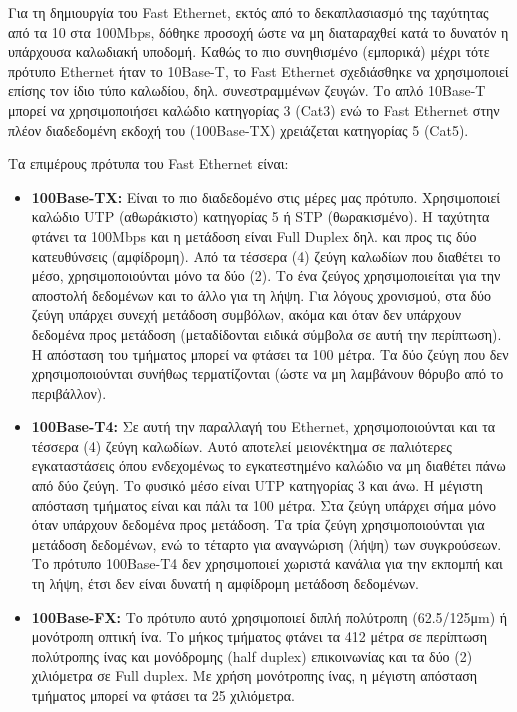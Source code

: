 Για τη δημιουργία του Fast Ethernet, εκτός από το δεκαπλασιασμό της ταχύτητας από τα 10 στα 100Mbps, δόθηκε προσοχή ώστε να μη διαταραχθεί κατά το δυνατόν η υπάρχουσα καλωδιακή υποδομή. Καθώς το πιο συνηθισμένο (εμπορικά) μέχρι τότε πρότυπο Ethernet ήταν το 10Base-T, το Fast Ethernet σχεδιάσθηκε να χρησιμοποιεί επίσης τον ίδιο τύπο καλωδίου, δηλ. συνεστραμμένων ζευγών. Το απλό 10Base-T μπορεί να χρησιμοποιήσει καλώδιο κατηγορίας 3 (Cat3) ενώ το Fast Ethernet στην πλέον διαδεδομένη εκδοχή του (100Base-TX) χρειάζεται κατηγορίας 5 (Cat5). 

Τα επιμέρους πρότυπα του Fast Ethernet είναι:

\begin{itemize}
\item \textbf{100Base-TX:} Είναι το πιο διαδεδομένο στις μέρες μας πρότυπο. Χρησιμοποιεί καλώδιο UTP (αθωράκιστο) κατηγορίας 5 ή STP (θωρακισμένο). Η ταχύτητα φτάνει τα 100Mbps και η μετάδοση είναι Full Duplex δηλ. και προς τις δύο κατευθύνσεις (αμφίδρομη). Από τα τέσσερα (4) ζεύγη καλωδίων που διαθέτει το μέσο, χρησιμοποιούνται μόνο τα δύο (2). Το ένα ζεύγος χρησιμοποιείται για την αποστολή δεδομένων και το άλλο για τη λήψη. Για λόγους χρονισμού, στα δύο ζεύγη υπάρχει συνεχή μετάδοση συμβόλων, ακόμα και όταν δεν υπάρχουν δεδομένα προς μετάδοση (μεταδίδονται ειδικά σύμβολα σε αυτή την περίπτωση). Η απόσταση του τμήματος μπορεί να φτάσει τα 100 μέτρα. Τα δύο ζεύγη που δεν χρησιμοποιούνται συνήθως τερματίζονται (ώστε να μη λαμβάνουν θόρυβο από το περιβάλλον). 
\item \textbf{100Base-T4:} Σε αυτή την παραλλαγή του Ethernet, χρησιμοποιούνται και τα τέσσερα (4) ζεύγη καλωδίων. Αυτό αποτελεί μειονέκτημα σε παλιότερες εγκαταστάσεις όπου ενδεχομένως το εγκατεστημένο καλώδιο να μη διαθέτει πάνω από δύο ζεύγη. Το φυσικό μέσο είναι UTP κατηγορίας 3 και άνω. Η μέγιστη απόσταση τμήματος είναι και πάλι τα 100 μέτρα. Στα ζεύγη υπάρχει σήμα μόνο όταν υπάρχουν δεδομένα προς μετάδοση. Τα τρία ζεύγη χρησιμοποιούνται για μετάδοση δεδομένων, ενώ το τέταρτο για αναγνώριση (λήψη) των συγκρούσεων. Το πρότυπο 100Base-T4 δεν χρησιμοποιεί χωριστά κανάλια για την εκπομπή και τη λήψη, έτσι δεν είναι δυνατή η αμφίδρομη μετάδοση δεδομένων.
\item \textbf{100Base-FX:} Το πρότυπο αυτό χρησιμοποιεί διπλή πολύτροπη (62.5/125μm) ή μονότροπη οπτική ίνα. Το μήκος τμήματος φτάνει τα 412 μέτρα σε περίπτωση πολύτροπης ίνας και μονόδρομης (half duplex) επικοινωνίας και τα δύο (2) χιλιόμετρα σε Full duplex. Με χρήση μονότροπης ίνας, η μέγιστη απόσταση τμήματος μπορεί να φτάσει τα 25 χιλιόμετρα.
\end{itemize}

